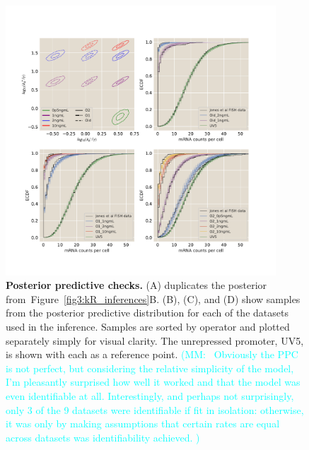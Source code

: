 \documentclass[12pt]{article}%
\newcommand{\mmnote}[1]{\textcolor{cyan}{(MM:~#1)}}
\newcommand{\fig}[1]{Figure~\ref{#1}}
\begin{document}
\begin{figure}%
\centering
\includegraphics[width=0.9\textwidth]{../figures/figSIxx/ppc_many_pooled.pdf}
\caption{\textbf{Posterior predictive checks.}
(A) duplicates the posterior from~\fig{fig3:kR_inferences}B.
(B), (C), and (D) show samples from the posterior predictive distribution
for each of the datasets used in the inference.
Samples are sorted by operator and plotted separately simply for visual clarity.
The unrepressed promoter, UV5, is shown with each as a reference point.
\mmnote{
Obviously the PPC is not perfect,
but considering the relative simplicity of the model, I'm pleasantly surprised
how well it worked and that the model was even identifiable at all.
Interestingly, and perhaps not surprisingly, only 3 of the 9 datasets
were identifiable if fit in isolation: otherwise,
it was only by making assumptions that certain rates are equal
across datasets was identifiability achieved.
}
    }
\label{fig4:ppc}
\end{figure}
\end{document}
